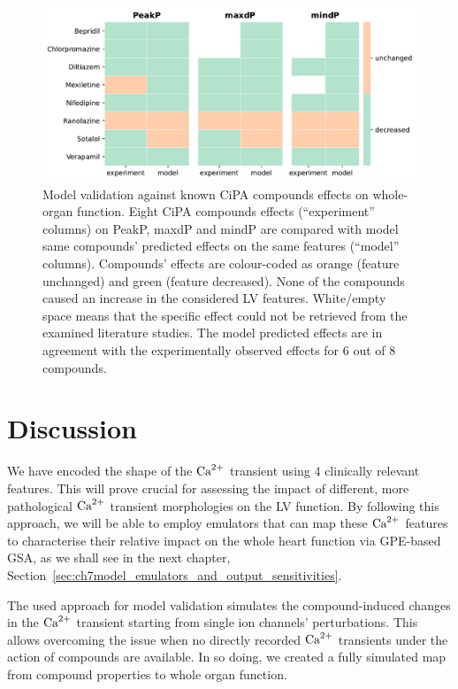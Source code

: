 \begin{figure}[ht!]
    \myfloatalign
    \includegraphics[width=\textwidth]{figures/chapter06/model_vs_experiments.pdf}
    \caption{Model validation against known CiPA compounds effects on whole-organ function. Eight CiPA compounds effects (``experiment'' columns) on PeakP, maxdP and mindP are compared with model same compounds' predicted effects on the same features (``model'' columns). Compounds' effects are colour-coded as orange (feature unchanged) and green (feature decreased). None of the compounds caused an increase in the considered LV features. White/empty space means that the specific effect could not be retrieved from the examined literature studies. The model predicted effects are in agreement with the experimentally observed effects for $6$ out of $8$ compounds.}
    \label{fig:validationtable}
\end{figure}


%
%
%
\section{Discussion}\label{sec:ch6discussion}
We have encoded the shape of the $\textrm{Ca}^{2+}$ transient using $4$ clinically relevant features. This will prove crucial for assessing the impact of different, more pathological $\textrm{Ca}^{2+}$ transient morphologies on the LV function. By following this approach, we will be able to employ emulators that can map these $\textrm{Ca}^{2+}$ features to characterise their relative impact on the whole heart function via GPE-based GSA, as we shall see in the next chapter, Section~\ref{sec:ch7model_emulators_and_output_sensitivities}.

\vspace{0.2cm}
The used approach for model validation simulates the compound-induced changes in the $\textrm{Ca}^{2+}$ transient starting from single ion channels' perturbations. This allows overcoming the issue when no directly recorded $\textrm{Ca}^{2+}$ transients under the action of compounds are available. In so doing, we created a fully simulated map from compound properties to whole organ function.


